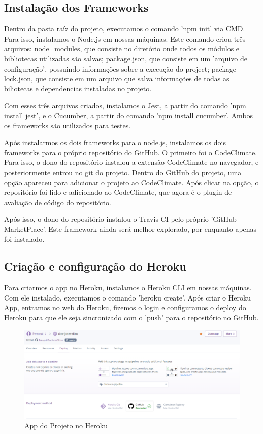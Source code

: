     \subsection{Instalação dos Frameworks}
    Dentro da pasta raíz do projeto, executamos o comando 'npm init' via CMD. Para isso, instalamos o Node.js
    em nossas máquinas. Este comando criou três arquivos: node\_modules, que consiste no diretório onde todos
    os módulos e bibliotecas utilizadas são salvas; package.json, que consiste em um 'arquivo de configuração',
    possuindo informações sobre a execução do project; package-lock.json, que consiste em um arquivo que salva
    informações de todas as biliotecas e dependencias instaladas no projeto.
    
    Com esses três arquivos criados, instalamos o Jest, a partir do comando 'npm install jest', e o Cucumber, a partir
    do comando 'npm install cucumber'. Ambos os frameworks são utilizados para testes.

    Após instalarmos os dois frameworks para o node.js, instalamos os dois frameworks para o próprio repositório do GitHub.
    O primeiro foi o CodeClimate. Para isso, o dono do repositório instalou a extensão CodeClimate no navegador,
    e posteriormente entrou no git do projeto. Dentro do GitHub do projeto, uma opção apareceu para adicionar
    o projeto ao CodeClimate. Após clicar na opção, o repositório foi lido e adicionado ao CodeClimate, 
    que agora é o plugin de avaliação de código do repositório.

    Após isso, o dono do repositório instalou o Travis CI pelo próprio 'GitHub MarketPlace'. Este framework ainda será melhor explorado,
    por enquanto apenas foi instalado.

    \subsection{Criação e configuração do Heroku}
    Para criarmos o app no Heroku, instalamos o Heroku CLI em nossas máquinas. Com ele instalado, executamos o comando
    'heroku create'. Após criar o Heroku App, entramos no web do Heroku, fizemos o login e configuramos o deploy do Heroku
    para que ele seja sincronizado com o 'push' para o repositório no GitHub.\\
    \begin{figure}[!htb]
        \centering
        \includegraphics[scale=0.5]{Imagens/Heroku.png}
        \caption{App do Projeto no Heroku}
    \end{figure}

